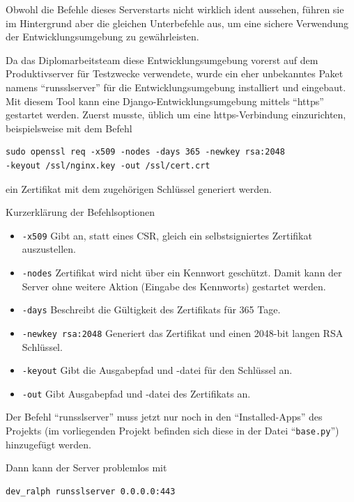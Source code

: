 \documentclass[
]{article}
\providecommand{\tightlist}{%
  \setlength{\itemsep}{0pt}\setlength{\parskip}{0pt}}
\begin{document}
Obwohl die Befehle dieses Serverstarts nicht wirklich ident aussehen,
führen sie im Hintergrund aber die gleichen Unterbefehle aus, um eine
sichere Verwendung der Entwicklungsumgebung zu gewährleisten.

Da das Diplomarbeitsteam diese Entwicklungsumgebung vorerst auf dem
Produktivserver für Testzwecke verwendete, wurde ein eher unbekanntes
Paket namens ``runsslserver'' für die Entwicklungsumgebung installiert
und eingebaut. Mit diesem Tool kann eine Django-Entwicklungsumgebung
mittels ``https'' gestartet werden. Zuerst musste, üblich um eine
https-Verbindung einzurichten, beispielsweise mit dem Befehl

\begin{verbatim}
sudo openssl req -x509 -nodes -days 365 -newkey rsa:2048 
-keyout /ssl/nginx.key -out /ssl/cert.crt
\end{verbatim}

ein Zertifikat mit dem zugehörigen Schlüssel generiert werden.

Kurzerklärung der Befehlsoptionen

\begin{itemize}
\tightlist
\item
  \texttt{-x509} Gibt an, statt eines CSR, gleich ein selbstsigniertes
  Zertifikat auszustellen.
\item
  \texttt{-nodes} Zertifikat wird nicht über ein Kennwort geschützt.
  Damit kann der Server ohne weitere Aktion (Eingabe des Kennworts)
  gestartet werden.
\item
  \texttt{-days} Beschreibt die Gültigkeit des Zertifikats für 365 Tage.
\item
  \texttt{-newkey\ rsa:2048} Generiert das Zertifikat und einen 2048-bit
  langen RSA Schlüssel.
\item
  \texttt{-keyout} Gibt die Ausgabepfad und -datei für den Schlüssel an.
\item
  \texttt{-out} Gibt Ausgabepfad und -datei des Zertifikats an.
\end{itemize}

Der Befehl ``runsslserver'' muss jetzt nur noch in den
``Installed-Apps'' des Projekts (im vorliegenden Projekt befinden sich
diese in der Datei ``\texttt{base.py}'') hinzugefügt werden.

Dann kann der Server problemlos mit

\begin{verbatim}
dev_ralph runsslserver 0.0.0.0:443
\end{verbatim}
\end{document}
